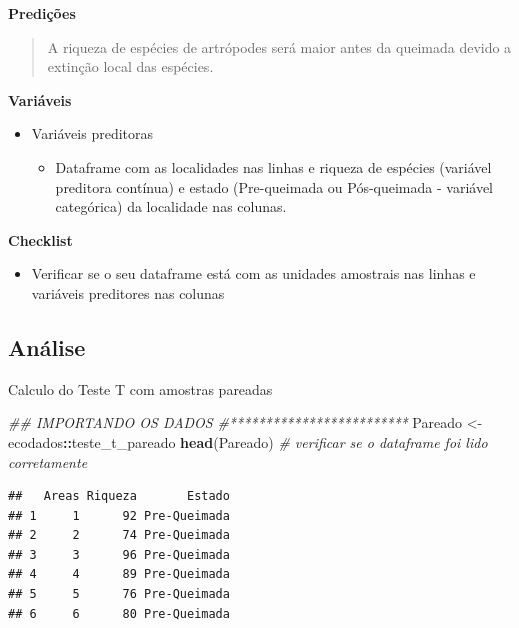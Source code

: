 \documentclass[
]{book}
\newenvironment{Shaded}{\begin{snugshade}}{\end{snugshade}}
\newcommand{\CommentTok}[1]{\textcolor[rgb]{0.56,0.35,0.01}{\textit{#1}}}
\newcommand{\KeywordTok}[1]{\textcolor[rgb]{0.13,0.29,0.53}{\textbf{#1}}}
\newcommand{\NormalTok}[1]{#1}
\newcommand{\OperatorTok}[1]{\textcolor[rgb]{0.81,0.36,0.00}{\textbf{#1}}}
\newcommand{\StringTok}[1]{\textcolor[rgb]{0.31,0.60,0.02}{#1}}
\providecommand{\tightlist}{%
  \setlength{\itemsep}{0pt}\setlength{\parskip}{0pt}}
\begin{document}
\textbf{Predições}

\begin{quote}
A riqueza de espécies de artrópodes será maior antes da queimada devido a extinção local das espécies.
\end{quote}

\textbf{Variáveis}

\begin{itemize}
\tightlist
\item
  Variáveis preditoras

  \begin{itemize}
  \tightlist
  \item
    Dataframe com as localidades nas linhas e riqueza de espécies (variável preditora contínua) e estado (Pre-queimada ou Pós-queimada - variável categórica) da localidade nas colunas.
  \end{itemize}
\end{itemize}

\textbf{Checklist}

\begin{itemize}
\tightlist
\item
  Verificar se o seu dataframe está com as unidades amostrais nas linhas e variáveis preditores nas colunas
\end{itemize}

\hypertarget{anuxe1lise-2}{%
\subsection{Análise}\label{anuxe1lise-2}}

Calculo do Teste T com amostras pareadas

\begin{Shaded}
\begin{Highlighting}[]
\CommentTok{## IMPORTANDO OS DADOS}
\CommentTok{#*************************}
\NormalTok{Pareado <-}\StringTok{ }\NormalTok{ecodados}\OperatorTok{::}\NormalTok{teste_t_pareado}
\KeywordTok{head}\NormalTok{(Pareado) }\CommentTok{# verificar se o dataframe foi lido corretamente}
\end{Highlighting}
\end{Shaded}

\begin{verbatim}
##   Areas Riqueza       Estado
## 1     1      92 Pre-Queimada
## 2     2      74 Pre-Queimada
## 3     3      96 Pre-Queimada
## 4     4      89 Pre-Queimada
## 5     5      76 Pre-Queimada
## 6     6      80 Pre-Queimada
\end{verbatim}
\end{document}
